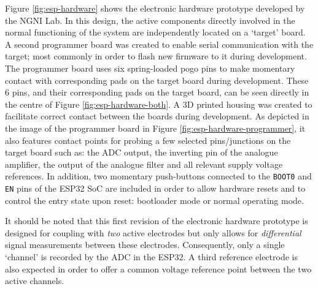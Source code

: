 Figure \ref{fig:esp-hardware} shows the electronic hardware prototype developed by the NGNI Lab. In this design, the active components directly involved in the normal functioning of the system are independently located on a `target' board. A second programmer board was created to enable serial communication with the target; most commonly in order to flash new firmware to it during development. The programmer board uses six spring-loaded pogo pins to make momentary contact with corresponding pads on the target board during development. These 6 pins, and their corresponding pads on the target board, can be seen directly in the centre of Figure \ref{fig:esp-hardware-both}. A 3D printed housing was created to facilitate correct contact between the boards during development. As depicted in the image of the programmer board in Figure \ref{fig:esp-hardware-programmer}, it also features contact points for probing a few selected pins/junctions on the target board such as: the ADC output, the inverting pin of the analogue amplifier, the output of the analogue filter and all relevant supply voltage references. In addition, two momentary push-buttons connected to the \texttt{BOOT0} and \texttt{EN} pins of the ESP32 SoC are included in order to allow hardware resets and to control the entry state upon reset: bootloader mode or normal operating mode. 

It should be noted that this first revision of the electronic hardware prototype is designed for coupling with \textit{two} active electrodes but only allows for \textit{differential} signal measurements between these electrodes. Consequently, only a single `channel' is recorded by the ADC in the ESP32. A third reference electrode is also expected in order to offer a common voltage reference point between the two active channels. 


